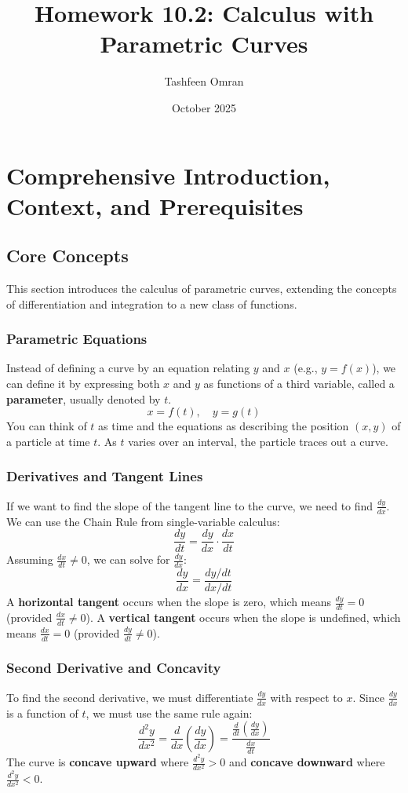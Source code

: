 \documentclass{article}
\title{Homework 10.2: Calculus with Parametric Curves}
\author{Tashfeen Omran}
\date{October 2025}
\begin{document}
\maketitle

\tableofcontents
\newpage

\section{Comprehensive Introduction, Context, and Prerequisites}

\subsection{Core Concepts}
This section introduces the calculus of parametric curves, extending the concepts of differentiation and integration to a new class of functions.

\subsubsection{Parametric Equations}
Instead of defining a curve by an equation relating $y$ and $x$ (e.g., $y = f(x)$), we can define it by expressing both $x$ and $y$ as functions of a third variable, called a \textbf{parameter}, usually denoted by $t$.
\[
x = f(t), \quad y = g(t)
\]
You can think of $t$ as time and the equations as describing the position $(x, y)$ of a particle at time $t$. As $t$ varies over an interval, the particle traces out a curve.

\subsubsection{Derivatives and Tangent Lines}
If we want to find the slope of the tangent line to the curve, we need to find $\frac{dy}{dx}$. We can use the Chain Rule from single-variable calculus:
\[
\frac{dy}{dt} = \frac{dy}{dx} \cdot \frac{dx}{dt}
\]
Assuming $\frac{dx}{dt} \neq 0$, we can solve for $\frac{dy}{dx}$:
\[
\frac{dy}{dx} = \frac{dy/dt}{dx/dt}
\]
A \textbf{horizontal tangent} occurs when the slope is zero, which means $\frac{dy}{dt} = 0$ (provided $\frac{dx}{dt} \neq 0$).
A \textbf{vertical tangent} occurs when the slope is undefined, which means $\frac{dx}{dt} = 0$ (provided $\frac{dy}{dt} \neq 0$).

\subsubsection{Second Derivative and Concavity}
To find the second derivative, we must differentiate $\frac{dy}{dx}$ with respect to $x$. Since $\frac{dy}{dx}$ is a function of $t$, we must use the same rule again:
\[
\frac{d^2y}{dx^2} = \frac{d}{dx}\left(\frac{dy}{dx}\right) = \frac{\frac{d}{dt}\left(\frac{dy}{dx}\right)}{\frac{dx}{dt}}
\]
The curve is \textbf{concave upward} where $\frac{d^2y}{dx^2} > 0$ and \textbf{concave downward} where $\frac{d^2y}{dx^2} < 0$.
\end{document}
